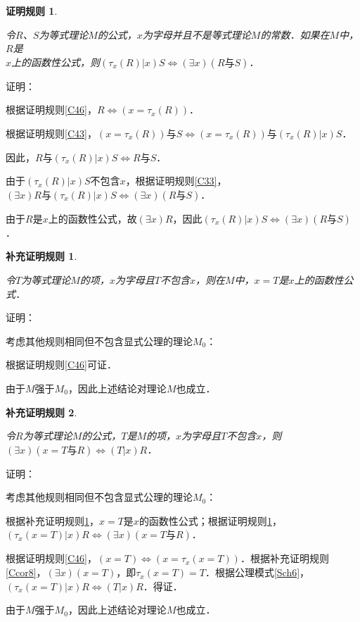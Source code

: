 \documentclass[12pt, a4paper, oneside]{book}
\newtheorem{C}{证明规则}
\newtheorem{Ccor}{补充证明规则}
\begin{document}
			\begin{C}\label{C47}
				\hfill\par
				令$R$、$S$为等式理论$M$的公式，$x$为字母并且不是等式理论$M$的常数．如果在$M$中，$R$是\\$x$上的函数性公式，则$(\tau_x(R)|x)S\Leftrightarrow (\exists x)(R\text{与}S)$．
			\end{C}
			证明：
			\par
			根据证明规则\ref{C46}，$R\Leftrightarrow (x=\tau_x(R))$．
			\par			根据证明规则\ref{C43}，$(x=\tau_x(R))\text{与}S\Leftrightarrow (x=\tau_x(R))\text{与}(\tau_x(R)|x)S$．
			\par
			因此，$R\text{与}(\tau_x(R)|x)S\Leftrightarrow R\text{与}S$．
			\par
			由于$(\tau_x(R)|x)S$不包含$x$，根据证明规则\ref{C33}，$(\exists x)R\text{与} (\tau_x(R)|x)S\Leftrightarrow (\exists x)(R\text{与}S)$．
			\par
			由于$R$是$x$上的函数性公式，故$(\exists x)R$，因此$(\tau_x(R)|x)S\Leftrightarrow (\exists x)(R\text{与}S)$．						

			\begin{Ccor}\label{Ccor9}	
				\hfill\par			
				令$T$为等式理论$M$的项，$x$为字母且$T$不包含$x$，则在$M$中，$x=T$是$x$上的函数性公式．
			\end{Ccor}
			证明：
			\par
			考虑其他规则相同但不包含显式公理的理论$M_0$：
			\par
			根据证明规则\ref{C46}可证．
			\par
			由于$M$强于$M_0$，因此上述结论对理论$M$也成立．
			
			\begin{Ccor}\label{Ccor10}
				\hfill\par		
				令$R$为等式理论$M$的公式，$T$是$M$的项，$x$为字母且$T$不包含$x$，则$(\exists x)(x=T\text{与}R)\Leftrightarrow (T|x)R$．
			\end{Ccor}
			证明：
			\par
			考虑其他规则相同但不包含显式公理的理论$M_0$：
			\par
			根据补充证明规则\ref{Ccor9}，$x=T$是$x$的函数性公式；根据证明规则\ref{C47}，$(\tau_x(x=T)|x)R\Leftrightarrow (\exists x)(x=T\text{与}R)$．
			\par
			根据证明规则\ref{C46}，$(x=T)\Leftrightarrow (x=\tau_x(x=T))$．根据补充证明规则\ref{Ccor8}，$(\exists x)(x=T)$，即$\tau_x(x=T)=T$．根据公理模式\ref{Sch6}，$(\tau_x(x=T)|x)R\Leftrightarrow (T|x)R$．得证．
			\par
			由于$M$强于$M_0$，因此上述结论对理论$M$也成立．
\end{document}
